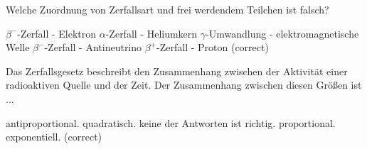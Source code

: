 \documentclass[11pt]{exam}
\begin{document}
\begin{questions}
\vspace{3mm}\question Welche Zuordnung von Zerfallsart und frei werdendem Teilchen ist falsch?

\begin{choices}
	\choice \( \beta^- \)-Zerfall - Elektron
	\choice \( \alpha \)-Zerfall - Heliumkern
	\choice \( \gamma \)-Umwandlung - elektromagnetische Welle
	\choice \( \beta^- \)-Zerfall - Antineutrino
	\choice \( \beta^+ \)-Zerfall - Proton (correct)
\end{choices}

\vspace{3mm}\question Das Zerfallsgesetz beschreibt den Zusammenhang zwischen der Aktivität einer radioaktiven Quelle und der Zeit. Der Zusammenhang zwischen diesen Größen ist ...

\begin{choices}
	\choice antiproportional.
	\choice quadratisch.
	\choice keine der Antworten ist richtig.
	\choice proportional.
	\choice exponentiell. (correct)
\end{choices}

\vspace{3mm}\end{questions}
\end{document}
